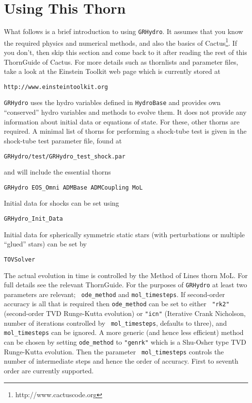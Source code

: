 \documentclass{article}
\begin{document}
\section{Using This Thorn}
\label{sec:use}

What follows is a brief introduction to using {\tt GRHydro}. It assumes that
you know the required physics and numerical methods, and also the
basics of Cactus\footnote{http://www.cactuscode.org}. If you don't, then skip this section and come back
to it after reading the rest of this ThornGuide of Cactus. For more details such
as thornlists and parameter files, take a look at the Einstein Toolkit web page
which is currently stored at
\begin{verbatim}
http://www.einsteintoolkit.org
\end{verbatim}

{\tt GRHydro} uses the hydro variables defined in {\tt HydroBase}
and provides own ``conserved'' hydro variables and methods to evolve them. It
does not provide any information about initial data or equations of
state. For these, other thorns are required. A minimal list of thorns
for performing a shock-tube test is given in the shock-tube test
parameter file, found at
\begin{verbatim}
GRHydro/test/GRHydro_test_shock.par
\end{verbatim}
and will include the essential thorns
\begin{verbatim}
GRHydro EOS_Omni ADMBase ADMCoupling MoL
\end{verbatim}
Initial data for shocks can be set using
\begin{verbatim}
GRHydro_Init_Data 
\end{verbatim}
Initial data for spherically symmetric static stars (with
perturbations or multiple ``glued'' stars) can be set by
\begin{verbatim}
TOVSolver
\end{verbatim}

The actual evolution in time is controlled by the Method of Lines
thorn MoL. For full details see the relevant ThornGuide. For the
purposes of {\tt GRHydro} at least two parameters are relevant; {\tt
  ode\_method} and {\tt mol\_timesteps}. If second-order accuracy is
all that is required then {\tt ode\_method} can be set to either {\tt
  "rk2"} (second-order TVD Runge-Kutta evolution) or {\tt "icn"}
(Iterative Crank Nicholson, number of iterations controlled by {\tt
  mol\_timesteps}, defaults to three), and {\tt mol\_timesteps} can be
ignored. A more generic (and hence less efficient) method can be
chosen by setting {\tt ode\_method} to {\tt "genrk"} which is a
Shu-Osher type TVD Runge-Kutta evolution. Then the parameter {\tt
  mol\_timesteps} controls the number of intermediate steps and hence
the order of accuracy. First to seventh order are currently supported.
\end{document}
